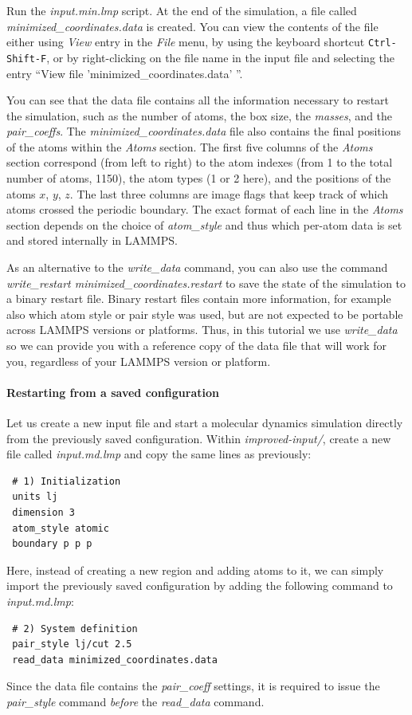 \documentclass[9pt,tutorial]{livecoms}
\begin{document}
Run the \textit{input.min.lmp} script.  At the end of the simulation, a
file called \textit{minimized\_coordinates.data} is created.  You can
view the contents of the file either using \textit{View} entry in the
\textit{File} menu, by using the keyboard shortcut
\texttt{Ctrl-Shift-F}, or by right-clicking on the file name in the
input file and selecting the entry ``View file
'minimized\_coordinates.data' ''.

You can see that the data file contains all the information necessary to
restart the simulation, such as the number of atoms, the box size, the
\textit{masses}, and the \textit{pair\_coeffs}.  The
\textit{minimized\_coordinates.data} file also contains the final
positions of the atoms within the \textit{Atoms} section. The first five
columns of the \textit{Atoms} section correspond (from left to right) to
the atom indexes (from 1 to the total number of atoms, 1150), the atom
types (1 or 2 here), and the positions of the atoms $x$, $y$, $z$. The
last three columns are image flags that keep track of which atoms
crossed the periodic boundary.  The exact format of each line in the
\textit{Atoms} section depends on the choice of \textit{atom\_style} and
thus which per-atom data is set and stored internally in LAMMPS.

As an alternative to the \textit{write\_data} command, you can also use
the command \textit{write\_restart minimized\_coordinates.restart} to
save the state of the simulation to a binary restart file.  Binary
restart files contain more information, for example also which atom
style or pair style was used, but are not expected to be portable across
LAMMPS versions or platforms.  Thus, in this tutorial we use
\textit{write\_data} so we can provide you with a reference copy of the
data file that will work for you, regardless of your LAMMPS version or
platform.

\paragraph{Restarting from a saved configuration}

Let us create a new input file and start a molecular dynamics simulation
directly from the previously saved configuration. Within
\textit{improved-input/}, create a new file called \textit{input.md.lmp}
and copy the same lines as previously:
{\normalsize
\begin{verbatim}
 # 1) Initialization
 units lj
 dimension 3
 atom_style atomic
 boundary p p p
\end{verbatim}
}
Here, instead of creating a new region and adding atoms to it, we can
simply import the previously saved configuration by adding the following
command to \textit{input.md.lmp}:
{\normalsize
\begin{verbatim}
 # 2) System definition
 pair_style lj/cut 2.5
 read_data minimized_coordinates.data
\end{verbatim}
}
Since the data file contains the \textit{pair\_coeff} settings, it is
required to issue the \textit{pair\_style} command \emph{before} the
\textit{read\_data} command.
\end{document}
